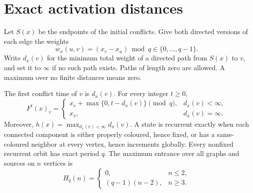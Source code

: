 \section{Exact activation distances}\label{sec:dynamics}
Let $S(x)$ be the endpoints of the initial conflicts. Give both directed
versions of each edge the weights
\[
 w_x(u,v)=(x_v-x_u)\bmod q\in\{0,\ldots,q-1\}.
\]
Write $d_x(v)$ for the minimum total weight of a directed path from $S(x)$
to $v$, and set it to $\infty$ if no such path exists. Paths of length zero
are allowed. A maximum over no finite distances means zero.

\begin{theorem}\label{thm:temporal}
The first conflict time of $v$ is $d_x(v)$. For every integer $t\ge0$,
\begin{equation}\label{eq:iterate}
 F^t(x)_v=
 \begin{cases}
 x_v+\max\{0,t-d_x(v)\}\pmod q,&d_x(v)<\infty,\\
 x_v,&d_x(v)=\infty.
 \end{cases}
\end{equation}
Moreover, $h(x)=\max_{d_x(v)<\infty}d_x(v)$. A state is recurrent exactly
when each connected component is either properly coloured, hence fixed,
or has a same-coloured neighbor at every vertex, hence increments globally.
Every nonfixed recurrent orbit has exact period $q$. The maximum entrance
over all graphs and sources on $n$ vertices is
\[
 H_q(n)=\begin{cases}0,&n\le2,\\(q-1)(n-2),&n\ge3.\end{cases}
\]
\end{theorem}
